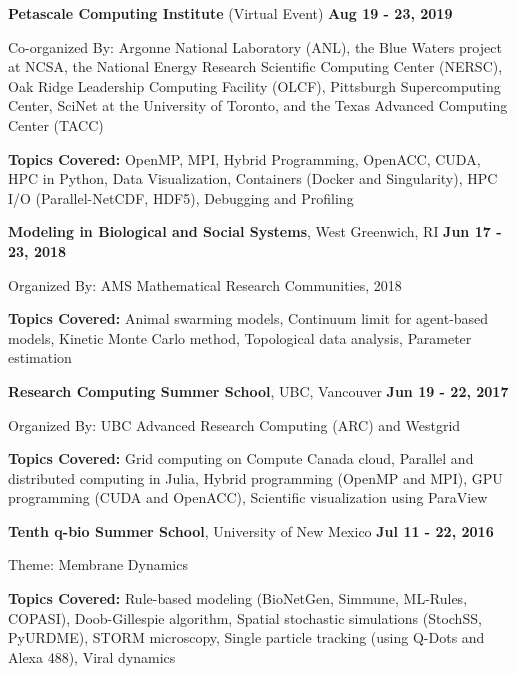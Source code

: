 \documentclass[margin,line]{res}
\newenvironment{list1}{
  \begin{list}{\ding{113}}{
      \setlength{\itemsep}{0in}
      \setlength{\parsep}{0in} \setlength{\parskip}{0in}
      \setlength{\topsep}{0in} \setlength{\partopsep}{0in}
      \setlength{\leftmargin}{0.17in}}}{\end{list}}
\begin{document}
\begin{resume}
{\bf Petascale Computing Institute} (Virtual Event) \hfill {\bf Aug 19 - 23, 2019}\\
\vspace*{-.2cm}
\begin{list1}
\item[] Co-organized By: Argonne National Laboratory (ANL), the Blue Waters project at NCSA, the National Energy Research Scientific Computing Center (NERSC), Oak Ridge Leadership Computing Facility (OLCF), Pittsburgh Supercomputing Center, SciNet at the University of Toronto, and the Texas Advanced Computing Center (TACC)
\vspace*{0.2cm}
\item[] {\bf Topics Covered:} OpenMP, MPI, Hybrid Programming, OpenACC, CUDA, HPC in Python, Data Visualization, Containers (Docker and Singularity), HPC I/O (Parallel-NetCDF, HDF5), Debugging and Profiling
\end{list1}

{\bf Modeling in Biological and Social Systems}, West Greenwich, RI \hfill {\bf Jun 17 - 23, 2018}\\
\vspace*{-.2cm}
\begin{list1}
\item[] Organized By: AMS Mathematical Research Communities, 2018
\vspace*{0.2cm}
\item[] {\bf Topics Covered:} Animal swarming models, Continuum limit for agent-based models, Kinetic Monte Carlo method, Topological data analysis, Parameter estimation
\end{list1}

{\bf Research Computing Summer School}, UBC, Vancouver \hfill {\bf Jun 19 - 22, 2017}\\
\vspace*{-.2cm}
\begin{list1}
\item[] Organized By: UBC Advanced Research Computing (ARC) and Westgrid
\vspace*{0.2cm}
\item[] {\bf Topics Covered:} Grid computing on Compute Canada cloud, Parallel and distributed computing in Julia, Hybrid programming (OpenMP and MPI), GPU programming (CUDA and OpenACC), Scientific visualization using ParaView
\end{list1}

{\bf Tenth q-bio Summer School}, University of New Mexico \hfill {\bf Jul 11 - 22, 2016}\\
\vspace*{-.2cm}
\begin{list1}
\item[] Theme: Membrane Dynamics
\vspace*{0.2cm}
\item[] {\bf Topics Covered:} Rule-based modeling (BioNetGen, Simmune, ML-Rules, COPASI), Doob-Gillespie algorithm, Spatial stochastic simulations (StochSS, PyURDME), STORM microscopy, Single particle tracking (using Q-Dots and Alexa 488), Viral dynamics
\end{list1}


\end{resume}
\end{document}
